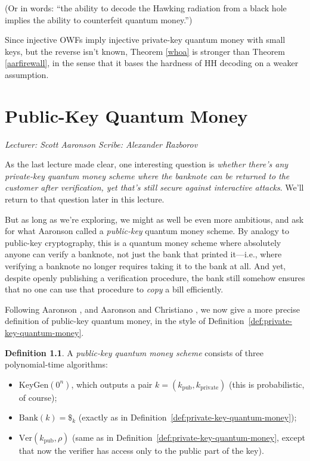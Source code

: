 \documentclass[11pt]{report}
\theoremstyle{plain}
\theoremstyle{definition}
\newtheorem{definition}[theorem]{Definition}
\newcommand{\lecture}[3]{%
  \chapter{#3}%
  \vspace{-5ex}%
  \textit{Lecturer: #1 \hfill Scribe: #2}\par%
  \vspace{1ex}\titlerule\vspace{2ex}}
\begin{document}
(Or in words: ``the ability to decode the Hawking radiation from a black hole implies the ability to counterfeit quantum money.'')

Since injective OWFs imply injective private-key quantum money with small keys, but the reverse isn't known, Theorem \ref{whoa} is stronger than Theorem \ref{aarfirewall}, in the sense that it bases the hardness of HH decoding on a weaker assumption.


\lecture{Scott Aaronson}{Alexander Razborov}{Public-Key Quantum Money}

As the last lecture made clear, one interesting question is {\em whether there's any private-key quantum money scheme where the banknote can be returned to the customer after verification, yet that's still secure against interactive attacks}.  We'll return to that question later in this lecture.

But as long as we're exploring, we might as well be even more ambitious, and ask for what Aaronson \cite{Aar09} called a {\em public-key} quantum money scheme.  By analogy to public-key cryptography, this is a quantum money scheme where absolutely anyone can verify a banknote, not just the bank that printed it---i.e., where verifying a banknote no longer requires taking it to the bank at all.  And yet, despite openly publishing a verification procedure, the bank still somehow ensures that no one can use that procedure to {\em copy} a bill efficiently.

Following Aaronson \cite{Aar09}, and Aaronson and Christiano \cite{achristiano}, we now give a more precise definition of public-key quantum money, in the style of Definition~\ref{def:private-key-quantum-money}.

\begin{definition}
A {\em public-key quantum money scheme} consists of three polynomial-time algorithms:
\begin{itemize}
\item $\text{KeyGen}(0^n)$, which outputs a pair $k = (k_{\text{pub}}, k_{\text{private}})$ (this is probabilistic, of course);

\item $\text{Bank}(k)=\$_k$ (exactly as in Definition~\ref{def:private-key-quantum-money});

\item $\text{Ver}(k_{\text{pub}}, \rho)$ (same as in Definition~\ref{def:private-key-quantum-money}, except that now the verifier has access only to the public part of the key).
\end{itemize}
\end{definition}
\end{document}
